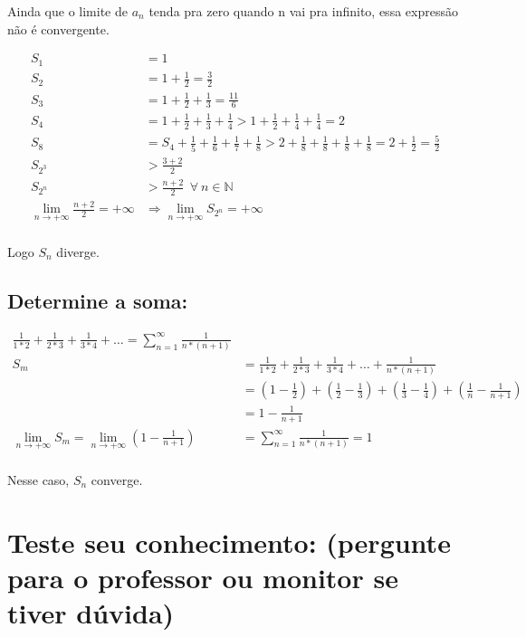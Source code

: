 \documentclass[12pt,openany, letterpaper]{book}
\begin{document}
Ainda que o limite de $a_n$ tenda pra zero quando n vai pra infinito, essa expressão não é convergente.

\begin{align*}
S_1 &= 1 \\
S_2 &= 1 + \frac{1}{2} = \frac{3}{2} \\
S_3 &= 1 + \frac{1}{2} + \frac{1}{3} = \frac{11}{6} \\
S_4 &= 1 + \frac{1}{2} + \frac{1}{3} + \frac{1}{4} > 1 + \frac{1}{2} + \frac{1}{4} + \frac{1}{4} = 2 \\
S_8 &= S_4 + \frac{1}{5} + \frac{1}{6} + \frac{1}{7} + \frac{1}{8} > 2 + \frac{1}{8} + \frac{1}{8} + \frac{1}{8} + \frac{1}{8} = 2 + \frac{1}{2} = \frac{5}{2} \\
S_{2^3} &> \frac{3 + 2}{2} \\
S_{2^n} &> \frac{n + 2}{2} \ \ \forall \ n \in \mathds{N} \\
\lim_{n \rightarrow +\infty} \frac{n+2}{2} = +\infty &\Rightarrow \lim_{n \rightarrow +\infty} S_{2^n} = +\infty \\
\end{align*}

Logo $S_n$ diverge.

\subsection*{Determine a soma:}
\begin{align*}
\frac{1}{1*2} + \frac{1}{2*3} + \frac{1}{3*4} + \hdots = \sum_{n = 1}^{\infty} \frac{1}{n*(n+1)} \\
S_m &= \frac{1}{1*2} + \frac{1}{2*3} + \frac{1}{3*4} + \hdots + \frac{1}{n*(n+1)}\\
 &= \left(1 - \frac{1}{2}\right) + \left(\frac{1}{2} - \frac{1}{3}\right) + \left(\frac{1}{3} - \frac{1}{4}\right) + \left(\frac{1}{n} - \frac{1}{n+1}\right) \\
 &= 1 - \frac{1}{n+1} \\
 \lim_{n \rightarrow +\infty} S_m = \lim_{n \rightarrow +\infty} \left(1 - \frac{1}{n+1} \right) &=  \sum_{n = 1}^{\infty} \frac{1}{n*(n+1)} = 1 \\
\end{align*}

Nesse caso, $S_n$ converge.

\section{Teste seu conhecimento: (pergunte para o professor ou monitor se tiver dúvida)}
\label{sec:s28}
\end{document}
